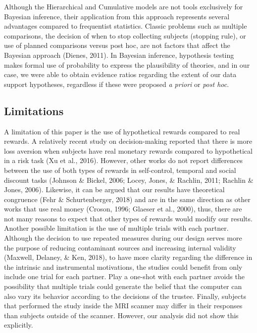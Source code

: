 \documentclass[12pt,]{article}
\begin{document}
Although the Hierarchical and Cumulative models are not tools
exclusively for Bayesian inference, their application from this approach
represents several advantages compared to frequentist statistics.
Classic problems such as multiple comparisons, the decision of when to
stop collecting subjects (stopping rule), or use of planned comparisons
versus post hoc, are not factors that affect the Bayesian approach
(Dienes, 2011). In Bayesian inference, hypothesis testing makes formal
use of probability to express the plausibility of theories, and in our
case, we were able to obtain evidence ratios regarding the extent of our
data support hypotheses, regardless if these were proposed \emph{a
priori} or \emph{post hoc}.

\hypertarget{limitations}{%
\subsection{Limitations}\label{limitations}}

A limitation of this paper is the use of hypothetical rewards compared
to real rewards. A relatively recent study on decision-making reported
that there is more loss aversion when subjects have real monetary
rewards compared to hypothetical in a risk task (Xu et al., 2016).
However, other works do not report differences between the use of both
types of rewards in self-control, temporal and social discount tasks
(Johnson \& Bickel, 2006; Locey, Jones, \& Rachlin, 2011; Rachlin \&
Jones, 2006). Likewise, it can be argued that our results have
theoretical congruence (Fehr \& Schurtenberger, 2018) and are in the
same direction as other works that use real money (Croson, 1996; Glaeser
et al., 2000), thus, there are not many reasons to expect that other
types of rewards would modify our results. Another possible limitation
is the use of multiple trials with each partner. Although the decision
to use repeated measures during our design serves more the purpose of
reducing contaminant sources and increasing internal validity (Maxwell,
Delaney, \& Ken, 2018), to have more clarity regarding the difference in
the intrinsic and instrumental motivations, the studies could benefit
from only include one trial for each partner. Play a one-shot with each
partner avoids the possibility that multiple trials could generate the
belief that the computer can also vary its behavior according to the
decisions of the trustee. Finally, subjects that performed the study
inside the MRI scanner may differ in their responses than subjects
outside of the scanner. However, our analysis did not show this
explicitly.
\end{document}
